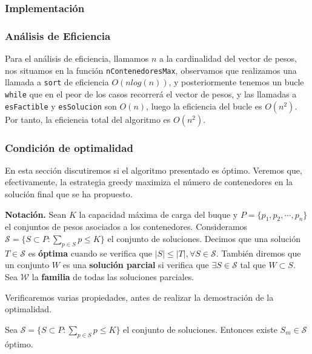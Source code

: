 \subsubsection{Implementación}



\subsubsection{Análisis de Eficiencia}

Para el análisis de eficiencia, llamamos $n$ a la cardinalidad del vector de pesos, nos situamos en la función \texttt{nContenedoresMax}, observamos que realizamos una llamada a \texttt{sort} de eficiencia $O(nlog(n))$, y posteriormente tenemos un bucle \texttt{while} que en el peor de los casos recorrerá el vector de pesos, y las llamadas a \texttt{esFactible} y \texttt{esSolucion} son $O(n)$, luego la eficiencia del bucle es $O(n^2)$. Por tanto, la eficiencia total del algoritmo es $O(n^2)$.

\subsubsection{Condición de optimalidad}
En esta sección discutiremos si el algoritmo presentado es óptimo. Veremos que,
efectivamente, la estrategia greedy maximiza el número de contenedores 
en la solución final que se ha propuesto. 

\textbf{Notación.} Sean $K$ la capacidad máxima de carga del buque y
$P = \{p_1,p_2,\cdots,p_n\}$ el conjuntos de pesos asociados
a los contenedores. Consideramos $\mathcal{S} = \{S \subset P : 
\sum_{p \in S} p \leq K\}$ el conjunto de soluciones. Decimos que una solución
$T \in \mathcal{S}$ es \textbf{óptima} cuando se verifica que $|S| \leq |T|,
\forall S \in \mathcal{S}$. 
También diremos que un conjunto $W$ es una \textbf{solución parcial}
si verifica que $\exists S \in \mathcal S$ tal que $W \subset S$. Sea $\mathcal{W}$ 
la \textbf{familia} de todas las soluciones parciales.

Verificaremos varias propiedades, antes de realizar la demostración de la optimalidad.

\begin{lemma}
    Sea $\mathcal{S} = \{S \subset P : \sum_{p \in S} p \leq K\}$ el conjunto de soluciones. Entonces
    existe $S_m \in \mathcal S$ óptimo. 
\end{lemma}


